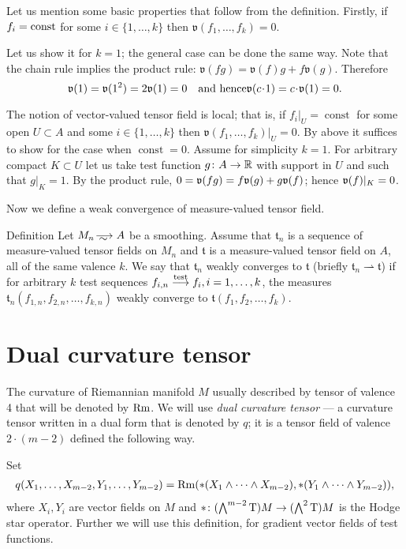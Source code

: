 Let us mention some basic properties that follow 
from the definition.
Firstly, if $f_i=\mathrm{const}$  for some $i\in\{1,\dots,k\}$ 
then $\mathfrak{v}(f_1,\dots,f_k)=0.$

Let us show it for $k=1$; the general case can be done the same way.
Note that the chain rule implies the
product rule:
$\mathfrak{v}(fg)=\mathfrak{v}(f)g+f\mathfrak{v}(g)$.
Therefore 
\[\vv(1)=\vv(1^2)=2\vv(1)=0
\quad\text{and hence}
\vv(c\cdot 1)=c\cdot\vv(1)=0.
\]

The notion of vector-valued tensor field is local;
that is, if $f_i|_{U}=\operatorname{const}$
for some open $U\subset A$ and some $i\in\{1,\dots,k\}$ 
 then $\mathfrak{v}(f_1,\dots,f_k)|_U=0.$
By above it suffices to show
for the case when $\operatorname{const}=0$.
Assume for simplicity  $k=1$. 
For arbitrary compact $K\subset U$ let
us take test function $g\colon A\to\mathbb{R}$ with support in
$U$ and such that $g|_K=1$.
By the product rule,
 $0=\mathfrak{v}(fg)=f\mathfrak{v}(g)+g\mathfrak{v}(f)$;
 hence 
$\mathfrak{v}(f)|_K=0$.
 




Now we define a weak convergence of measure-valued tensor field.

\begin{rdef} {Definition}
Let $M_n\smooths{} A$ be a smoothing.
Assume that $\mathfrak{t}_n$ is a sequence of %
 measure-valued tensor fields on $M_n$  and $\mathfrak{t}$ is a
measure-valued tensor field on $A$,
all of the same valence $k$.
We say that $\mathfrak{t}_n$ weakly converges to  $\mathfrak{t}$
(briefly $\mathfrak{t}_n\rightharpoonup\mathfrak{t}$) if for arbitrary $k$
test sequences 
$f_{i,n}\stackrel{\tiny\rm test}{\longrightarrow} f_i, i=1,\dots,k$, the measures $\mathfrak{t}_n(f_{1,n},f_{2,n},\dots,f_{k,n})$ weakly converge to $\mathfrak{t}(f_{1},f_{2},\dots,f_{k})$.
\end{rdef}

\section{Dual curvature tensor}

The curvature of Riemannian manifold $M$ usually described by tensor of valence 4 that will be denoted by $\operatorname{\rm Rm}$.
We will use \emph{dual curvature tensor} --- 
a curvature tensor written in a dual form that is denoted by $q$;
it is a tensor field of valence $2\cdot(m-2)$ defined the following way.

Set
\begin{multline*}
q(X_1,\dots,X_{m-2},Y_1,\dots,Y_{m-2})
= 
\operatorname{\rm Rm}(*(X_1\wedge\dots\wedge X_{m-2}), *(Y_1\wedge\dots\wedge Y_{m-2})),
\end{multline*}
where $X_i,Y_i$ are vector fields on $M$ and  ${*}\colon(\bigwedge^{m-2}\mathrm{T})M\to(\bigwedge^2\mathrm{T})M$ is the  Hodge star operator.
Further we will use this definition, for gradient vector fields of test functions.

